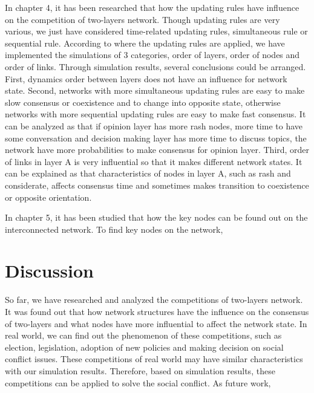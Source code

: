 In chapter 4, it has been researched that how the updating rules have influence on the competition of two-layers network. Though updating rules are very various, we just have considered time-related updating rules, simultaneous rule or sequential rule. According to where the updating rules are applied, we have implemented the simulations of 3 categories, order of layers, order of nodes and order of links. Through simulation results, several conclusions could be arranged.
First, dynamics order between layers does not have an influence for network state. Second, networks with more simultaneous updating rules are easy to make slow consensus or coexistence and to change into opposite state, otherwise networks with more sequential updating rules are easy to make fast consensus. It can be analyzed as that if opinion layer has more rash nodes, more time to have some conversation and decision making layer has more time to  discuss topics, the network have more probabilities to make consensus for opinion layer. Third, order of links in layer A is very influential so that it makes different network states. It can be explained as that characteristics of nodes in layer A, such as rash and considerate, affects consensus time and sometimes makes transition to coexistence or opposite orientation. 


In chapter 5, it has been studied that how the key nodes can be found out on the interconnected network. To find key nodes on the network, 

\section{Discussion} 
So far, we have researched and analyzed the competitions of two-layers network. It was found out that how network structures have the influence on the consensus of two-layers and what nodes have more influential to affect the network state. In real world, we can find out the phenomenon of these competitions, such as election, legislation, adoption of new policies and making decision on social conflict issues. These competitions of real world may have similar characteristics with our simulation results. Therefore, based on simulation results, these competitions can be applied to solve the social conflict.  As future work, 

